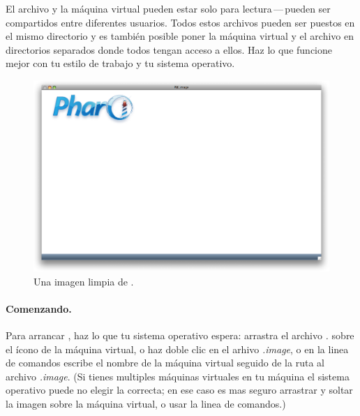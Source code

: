 \documentclass[a4paper,10pt,twoside]{book}
\begin{document}
El archivo  y la m\'aquina virtual pueden estar solo para lectura\,---\,pueden ser compartidos entre diferentes usuarios.
Todos estos archivos pueden ser puestos en el mismo directorio y es tambi\'en posible poner la m\'aquina virtual y el archivo  en directorios separados donde todos tengan acceso a ellos.
Haz lo que funcione mejor con tu estilo de trabajo y tu sistema operativo.


\begin{figure}[htb]
\centerline {\includegraphics[width=\textwidth]{startup}}
\caption{Una imagen limpia de \pbe.}
\end{figure}

\paragraph{Comenzando.} Para arrancar \pharo, haz lo que tu sistema operativo espera: arrastra el archivo \emph{.} sobre el \'icono de la m\'aquina virtual, o haz doble clic en el arhivo \emph{.image}, o en la linea de comandos escribe el nombre de la m\'aquina virtual seguido de la ruta al archivo \emph{.image}. (Si tienes multiples m\'aquinas virtuales en tu m\'aquina el sistema operativo puede no elegir la correcta; en ese caso es mas seguro arrastrar y soltar la imagen sobre la m\'aquina virtual, o usar la linea de comandos.)
\end{document}
